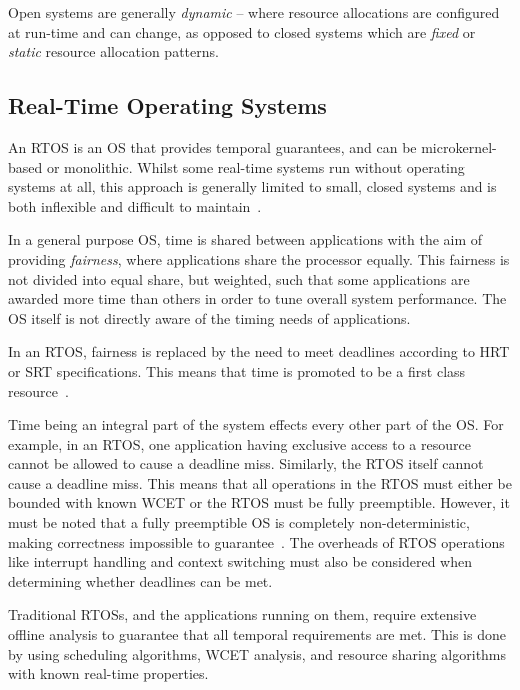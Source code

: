 Open systems are generally \emph{dynamic} -- where resource allocations are configured at run-time and can change, as opposed to closed systems which are \emph{fixed} or \emph{static} resource allocation patterns.

\subsection{Real-Time Operating Systems}

An \gls{RTOS} is an \gls{OS} that provides temporal guarantees, and can be microkernel-based or monolithic.
 Whilst some real-time systems run without operating systems at all, this approach is generally limited to small, closed systems and is both inflexible and difficult to maintain~\citep{Lui_AACBBBCLM_04}.

 In a general purpose \gls{OS}, time is shared between applications with the aim of providing \emph{fairness}, where applications share the processor equally.
 This fairness is not divided into equal share, but weighted, such that some applications are awarded more time than others in order to tune overall system performance.
The OS itself is not directly aware of the timing needs of applications.

 In an \gls{RTOS}, fairness is replaced by the need to meet deadlines according to \gls{HRT} or \gls{SRT} specifications.
 This means that time is promoted to be a first class resource~\citep{Stankovic_88}.

Time being an integral part of the system effects every other part of the \gls{OS}.
For example, in an \gls{RTOS}, one application having exclusive access to a resource cannot be allowed to cause a deadline miss.
Similarly, the \gls{RTOS} itself cannot cause a deadline miss.
This means that all operations in the \gls{RTOS} must either be bounded with known {\gls{WCET}} or the \gls{RTOS} must be fully preemptible.
However, it must be noted that a fully preemptible \gls{OS} is completely non-deterministic, making correctness impossible to guarantee~\citep{Blackham_TH_12}.
 The overheads of \gls{RTOS} operations like interrupt handling and context switching must also be considered when determining whether deadlines can be met.

Traditional \glspl{RTOS}, and the applications running on them, require extensive offline analysis to guarantee that all temporal requirements are met.
This is done by using scheduling algorithms, \gls{WCET} analysis, and resource sharing algorithms with known real-time properties.

